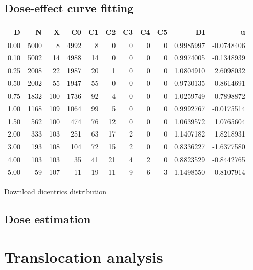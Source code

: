 \documentclass[]{scrartcl}
\begin{document}
\hypertarget{dose-effect-curve-fitting}{%
\subsection{Dose-effect curve fitting}\label{dose-effect-curve-fitting}}

\begin{tabular}{r|r|r|r|r|r|r|r|r|r|r}
\hline
D & N & X & C0 & C1 & C2 & C3 & C4 & C5 & DI & u\\
\hline
0.00 & 5000 & 8 & 4992 & 8 & 0 & 0 & 0 & 0 & 0.9985997 & -0.0748406\\
\hline
0.10 & 5002 & 14 & 4988 & 14 & 0 & 0 & 0 & 0 & 0.9974005 & -0.1348939\\
\hline
0.25 & 2008 & 22 & 1987 & 20 & 1 & 0 & 0 & 0 & 1.0804910 & 2.6098032\\
\hline
0.50 & 2002 & 55 & 1947 & 55 & 0 & 0 & 0 & 0 & 0.9730135 & -0.8614691\\
\hline
0.75 & 1832 & 100 & 1736 & 92 & 4 & 0 & 0 & 0 & 1.0259749 & 0.7898872\\
\hline
1.00 & 1168 & 109 & 1064 & 99 & 5 & 0 & 0 & 0 & 0.9992767 & -0.0175514\\
\hline
1.50 & 562 & 100 & 474 & 76 & 12 & 0 & 0 & 0 & 1.0639572 & 1.0765604\\
\hline
2.00 & 333 & 103 & 251 & 63 & 17 & 2 & 0 & 0 & 1.1407182 & 1.8218931\\
\hline
3.00 & 193 & 108 & 104 & 72 & 15 & 2 & 0 & 0 & 0.8336227 & -1.6377580\\
\hline
4.00 & 103 & 103 & 35 & 41 & 21 & 4 & 2 & 0 & 0.8823529 & -0.8442765\\
\hline
5.00 & 59 & 107 & 11 & 19 & 11 & 9 & 6 & 3 & 1.1498550 & 0.8107914\\
\hline
\end{tabular}

\href{https://biodosimetry-uab.github.io/documentation/data/count-data-IAEA.csv}{Download dicentrics distribution}

\hypertarget{dose-estimation}{%
\subsection{Dose estimation}\label{dose-estimation}}

\hypertarget{stats-trans}{%
\section{Translocation analysis}\label{stats-trans}}
\end{document}
